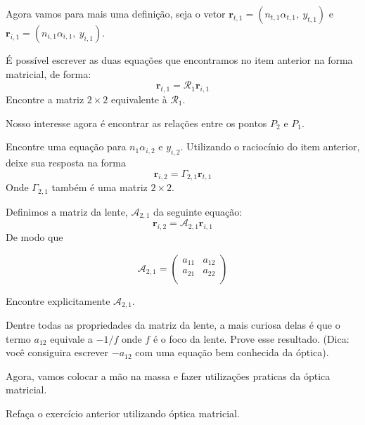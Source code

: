 \documentclass[11pt]{article}
\begin{document}
\begin{pproblem}
\begin{alternativas}
        Agora vamos para mais uma definição, seja o vetor \(\mathbf{r}_{t,1}= (n_{t,1}\alpha_{t,1}, \ y_{t,1})\) e \(\mathbf{r}_{i,1}= (n_{i,1}\alpha_{i,1}, \ y_{i,1})\).
        
            \item É possível escrever as duas equações que encontramos no item anterior na forma matricial, de forma:
            \[\mathbf{r}_{t,1}=\mathcal{R}_1\mathbf{r}_{i,1}\]
            Encontre a matriz \(2\times 2\) equivalente à \(\mathcal{R}_1\).

        Nosso interesse agora é encontrar as relações entre os pontos \(P_2\) e \(P_1\).

            \item Encontre uma equação para \(n_1\alpha_{i,2}\) e \(y_{i,2}\). Utilizando o raciocínio do item anterior, deixe sua resposta na forma
            \[\mathbf{r}_{i,2}=\Gamma_{2,1}\mathbf{r}_{t,1}\]
            Onde \(\Gamma_{2,1}\) também é uma matriz \(2\times 2\).

            \item Definimos a matriz da lente, \(\mathcal{A}_{2,1}\) da seguinte equação:
            \[\mathbf{r}_{i,2} = \mathcal{A}_{2,1}\mathbf{r}_{i,1}\]
            De modo que

            \[\mathcal{A}_{2,1} = \begin{pmatrix}
                a_{11} & a_{12} \\
                a_{21} & a_{22} \\
            \end{pmatrix}\]

            Encontre explicitamente \(\mathcal{A}_{2,1}\).

            \item Dentre todas as propriedades da matriz da lente, a mais curiosa delas é que o termo \(a_{12}\) equivale a \(-1/f\) onde \(f\) é o foco da lente. Prove esse resultado. (Dica: você consiguira escrever \(-a_{12}\) com uma equação bem conhecida da óptica).
        
        Agora, vamos colocar a mão na massa e fazer utilizações praticas da óptica matricial.

            \item Refaça o exercício anterior utilizando óptica matricial.
        

\end{alternativas}
\end{pproblem}
\end{document}
